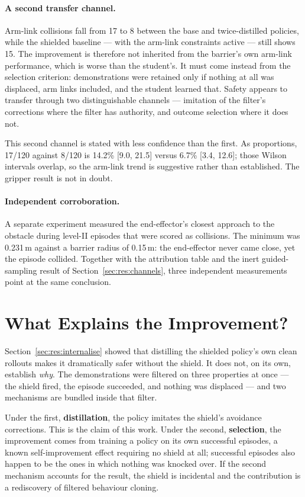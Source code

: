 \documentclass[a4paper,11pt]{report}
\begin{document}
\paragraph{A second transfer channel.}
Arm-link collisions fall from 17 to 8 between the base and twice-distilled policies, while the
shielded baseline --- with the arm-link constraints active --- still shows 15. The improvement is
therefore not inherited from the barrier's own arm-link performance, which is worse than the
student's. It must come instead from the selection criterion: demonstrations were retained only if
nothing at all was displaced, arm links included, and the student learned that. Safety appears to
transfer through two distinguishable channels --- imitation of the filter's corrections where the
filter has authority, and outcome selection where it does not.

This second channel is stated with less confidence than the first. As proportions, 17/120 against
8/120 is 14.2\% [9.0, 21.5] versus 6.7\% [3.4, 12.6]; those Wilson intervals overlap, so the
arm-link trend is suggestive rather than established. The gripper result is not in doubt.

\paragraph{Independent corroboration.}
A separate experiment measured the end-effector's closest approach to the obstacle during level-II
episodes that were scored as collisions. The minimum was 0.231\,m against a barrier radius of
0.15\,m: the end-effector never came close, yet the episode collided. Together with the attribution
table and the inert guided-sampling result of Section~\ref{sec:res:channels}, three independent
measurements point at the same conclusion.


\section{What Explains the Improvement?}\label{sec:res:mechanism}

Section~\ref{sec:res:internalise} showed that distilling the shielded policy's own clean rollouts
makes it dramatically safer without the shield. It does not, on its own, establish \emph{why}. The
demonstrations were filtered on three properties at once --- the shield fired, the episode
succeeded, and nothing was displaced --- and two mechanisms are bundled inside that filter.

Under the first, \textbf{distillation}, the policy imitates the shield's avoidance corrections.
This is the claim of this work. Under the second, \textbf{selection}, the improvement comes from
training a policy on its own successful episodes, a known self-improvement effect requiring no
shield at all; successful episodes also happen to be the ones in which nothing was knocked over. If
the second mechanism accounts for the result, the shield is incidental and the contribution is a
rediscovery of filtered behaviour cloning.
\end{document}
